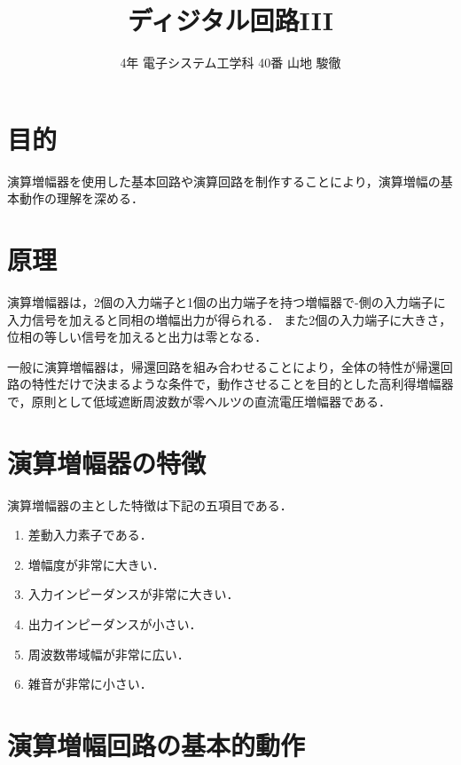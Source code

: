 \documentclass[10pt, a4j, dvipdfmx]{jarticle}
\title{ディジタル回路III}
\author{4年 電子システム工学科 40番  山地 駿徹}
\begin{document}
\section{目的}
演算増幅器を使用した基本回路や演算回路を制作することにより，演算増幅の基本動作の理解を深める．


\section{原理}
演算増幅器は，2個の入力端子と1個の出力端子を持つ増幅器で-側の入力端子に入力信号を加えると同相の増幅出力が得られる．
また2個の入力端子に大きさ，位相の等しい信号を加えると出力は零となる．

一般に演算増幅器は，帰還回路を組み合わせることにより，全体の特性が帰還回路の特性だけで決まるような条件で，動作させることを目的とした高利得増幅器で，原則として低域遮断周波数が零ヘルツの直流電圧増幅器である．


\section{演算増幅器の特徴}
演算増幅器の主とした特徴は下記の五項目である．
\begin{enumerate}
    \renewcommand{\labelenumi}{(\arabic{enumi})}
    \item 差動入力素子である．
    \item 増幅度が非常に大きい．
    \item 入力インピーダンスが非常に大きい．                                                                                                                                                                                                                                                     
    \item 出力インピーダンスが小さい．
    \item 周波数帯域幅が非常に広い．
    \item 雑音が非常に小さい．
\end{enumerate}

\newpage
\section{演算増幅回路の基本的動作}
\renewcommand{\thesubsection}{[\Alph{subsection}]}
\end{document}
